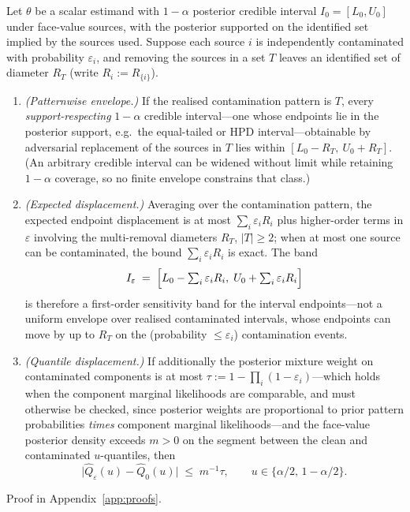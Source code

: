 \begin{proposition}\label{prop:robust}
Let $\theta$ be a scalar estimand with $1-\alpha$ posterior credible interval $I_0=[L_0,U_0]$ under face-value sources, with the posterior supported on the identified set implied by the sources used. Suppose each source $i$ is independently contaminated with probability $\varepsilon_i$, and removing the sources in a set $T$ leaves an identified set of diameter $R_T$ (write $R_i:=R_{\{i\}}$).
\begin{enumerate}[label=(\roman*),leftmargin=*]
\item \emph{(Patternwise envelope.)} If the realised contamination pattern is $T$, every \emph{support-respecting} $1-\alpha$ credible interval---one whose endpoints lie in the posterior support, e.g.\ the equal-tailed or HPD interval---obtainable by adversarial replacement of the sources in $T$ lies within $[L_0-R_T,\ U_0+R_T]$. (An arbitrary credible interval can be widened without limit while retaining $1-\alpha$ coverage, so no finite envelope constrains that class.)
\item \emph{(Expected displacement.)} Averaging over the contamination pattern, the expected endpoint displacement is at most $\sum_i\varepsilon_i R_i$ plus higher-order terms in $\varepsilon$ involving the multi-removal diameters $R_T$, $|T|\ge 2$; when at most one source can be contaminated, the bound $\sum_i\varepsilon_i R_i$ is exact. The band
\begin{equation}\label{eq:Iepsilon}
I_\varepsilon \;=\; \Bigl[L_0-\textstyle\sum_i\varepsilon_i R_i,\; U_0+\textstyle\sum_i\varepsilon_i R_i\Bigr]
\end{equation}
is therefore a first-order sensitivity band for the interval endpoints---not a uniform envelope over realised contaminated intervals, whose endpoints can move by up to $R_T$ on the (probability $\le\varepsilon_i$) contamination events.
\item \emph{(Quantile displacement.)} If additionally the posterior mixture weight on contaminated components is at most $\tau:=1-\prod_i(1-\varepsilon_i)$---which holds when the component marginal likelihoods are comparable, and must otherwise be checked, since posterior weights are proportional to prior pattern probabilities \emph{times} component marginal likelihoods---and the face-value posterior density exceeds $m>0$ on the segment between the clean and contaminated $u$-quantiles, then
\[
\bigl|\hat Q_\varepsilon(u)-\hat Q_0(u)\bigr|
   \;\le\; m^{-1}\tau,
\qquad u\in\{\alpha/2,\,1-\alpha/2\}.
\]
\end{enumerate}
\end{proposition}
Proof in Appendix~\ref{app:proofs}.

